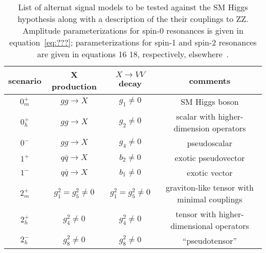\begin{table}
\begin{tabular}{cccc}
\hline 
\hline
scenario & X production & $X\to VV$ decay & comments \\
\hline
$0_m^+$ & $gg\to X$ & $g_1\neq 0$ & SM Higgs boson \\ 
$0_h^+$ & $gg\to X$ & $g_2\neq 0$ & scalar with higher-dimension operators \\ 
$0^-$ & $gg\to X$ & $g_4\neq 0$ & pseudoscalar \\ 
$1^+$ & $q\bar{q}\to X$ & $b_2\neq 0$ & exotic pseudovector\\
$1^-$ & $q\bar{q}\to X$ & $b_1\neq 0$ & exotic vector \\ 
$2_m^+$ & $g_1^{2}=g_5^{2}\neq 0$ & $g_1^{2}=g_5^{2}\neq 0$ & graviton-like tensor with minimal couplings\\
$2_h^+$ & $g_4^{2}\neq 0$ & $g_4^{2}\neq 0$ & tensor with higher-dimensional operators\\
$2_h^-$ & $g_8^{2}\neq 0$ & $g_8^{2}\neq 0$ & ``pseudotensor''\\ 
\hline
\hline
\end{tabular}
\label{table:alternativeModels}
\caption{List of alternat signal models to be tested against the SM Higgs 
hypothesis along with a description of the their couplings to ZZ.  Amplitude
parameterizations for spin-0 resonances is given in equation~\ref{eq:???};
parameterizations for spin-1 and spin-2 resonances are given in equations 16 
18, respectively, elsewhere~\cite{???}.}
\end{table}


